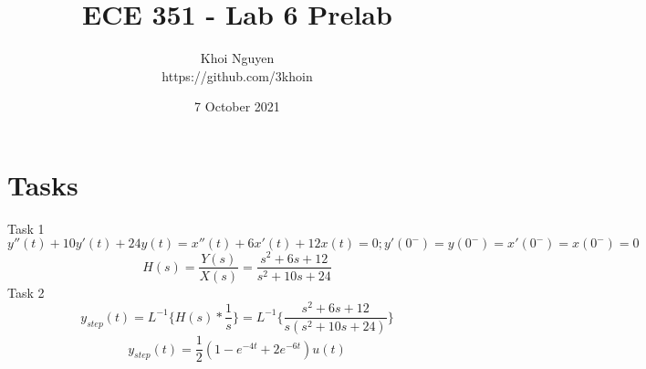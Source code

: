 \documentclass[11pt,a4,titlepage]{article}
\title{ECE 351 - Lab 6 Prelab}
\author{Khoi Nguyen \\ https://github.com/3khoin}
\date{7 October 2021}
\begin{document}
\maketitle
\pagebreak

\section*{Tasks}
Task 1
\[y''(t) + 10y'(t) + 24y(t) = x''(t) + 6x'(t) + 12x(t) = 0; y'(0^{-}) = y(0^{-}) = x'(0^{-}) = x(0^{-}) = 0\]
\[H(s) = \frac{Y(s)}{X(s)} = \frac{s^{2} + 6s + 12}{s^{2} + 10s + 24}\]
Task 2
\[y_{step}(t) = L^{-1}\{H(s) * \frac{1}{s}\} = L^{-1}\{\frac{s^{2} + 6s + 12}{s(s^{2} + 10s + 24)}\}\]
\[y_{step}(t) = \frac{1}{2}(1 - e^{-4t} + 2e^{-6t})u(t)\]


\end{document}
